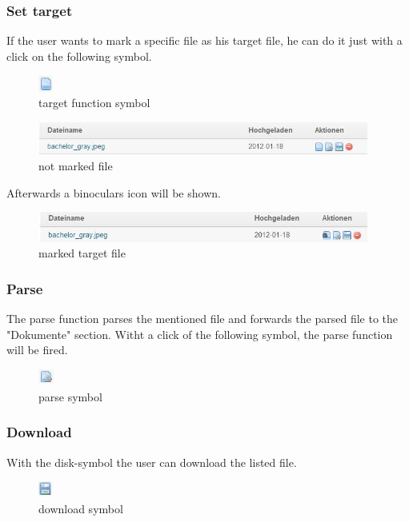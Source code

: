 \subsubsection{Set target}
If the user wants to mark a specific file as his target file, he can do it just with a click on the following symbol.
\begin{figure}[!ht]
  \centering
    \includegraphics[width=0.05\textwidth]{images/basic_functionalities/set_target2.jpg}
  \caption{target function symbol}
  \label{fig:einloggen}
\end{figure}
\begin{figure}[!ht]
  \centering
    \includegraphics[width=0.97\textwidth]{images/basic_functionalities/set_target1.jpg}
  \caption{not marked file}
  \label{fig:einloggen}
\end{figure}
Afterwards a binoculars icon will be shown.
\begin{figure}[!ht]
  \centering
    \includegraphics[width=0.97\textwidth]{images/basic_functionalities/set_target3.jpg}
  \caption{marked target file}
  \label{fig:target file}
\end{figure}
\subsubsection{Parse}
The parse function parses the mentioned file and forwards the parsed file to the "Dokumente" section.
Witht a click of the following symbol, the parse function will be fired.
\begin{figure}[!ht]
  \centering
    \includegraphics[width=0.05\textwidth]{images/basic_functionalities/parse_symbol.jpg}
  \caption{parse symbol}
  \label{fig:parse symbol}
\end{figure}
\subsubsection{Download}
With the disk-symbol the user can download the listed file.
\begin{figure}[!ht]
  \centering
    \includegraphics[width=0.05\textwidth]{images/basic_functionalities/download_symbol.jpg}
  \caption{download symbol}
  \label{fig:download symbol}
\end{figure}

